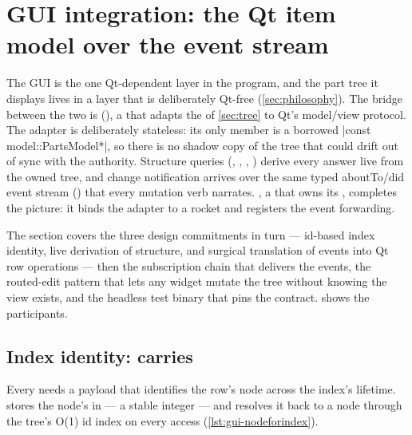 \section{GUI integration: the Qt item model over the event stream}\label{sec:gui}

The GUI is the one Qt-dependent layer in the program, and the part tree it displays lives in a
layer that is deliberately Qt-free (\cref{sec:philosophy}). The bridge between the two is
 (), a  that adapts
the  of \cref{sec:tree} to Qt's model/view protocol. The adapter is deliberately
stateless: its only member is a borrowed \cppinline|const model::PartsModel*|, so there is no
shadow copy of the tree that could drift out of sync with the authority. Structure queries
(, , , ) derive every answer live from the
owned tree, and change notification arrives over the same typed aboutTo/did event stream
() that every mutation verb narrates. , a
 that owns its , completes the picture: it binds the adapter
to a rocket and registers the event forwarding.

The section covers the three design commitments in turn --- id-based index identity, live
derivation of structure, and surgical translation of events into Qt row operations --- then the
subscription chain that delivers the events, the routed-edit pattern that lets any widget mutate
the tree without knowing the view exists, and the headless test binary that pins the
 contract.  shows the participants.


\subsection[Index identity: internalId carries Part::Id]{Index identity:  carries }\label{sec:gui-identity}

Every  needs a payload that identifies the row's node across the index's
lifetime.  stores the node's  in
 --- a stable integer --- and resolves it back to a node through the
tree's O(1) id index on every access (\cref{lst:gui-nodeforindex}).

